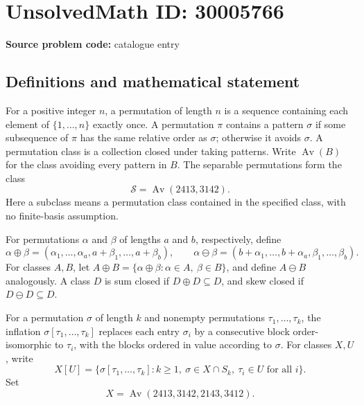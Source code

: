 \documentclass[11pt]{article}
\begin{document}
\section*{UnsolvedMath ID: 30005766}
\textbf{Source problem code:} catalogue entry
\subsection{Definitions and mathematical statement}
For a positive integer \(n\), a permutation of length \(n\) is a sequence containing each element of \(\{1,\ldots,n\}\) exactly once. A permutation \(\pi\) contains a pattern \(\sigma\) if some subsequence of \(\pi\) has the same relative order as \(\sigma\); otherwise it avoids \(\sigma\). A permutation class is a collection closed under taking patterns. Write \(\operatorname{Av}(B)\) for the class avoiding every pattern in \(B\). The separable permutations form the class
\[
\mathcal S=\operatorname{Av}(2413,3142).
\]
Here a subclass means a permutation class contained in the specified class, with no finite-basis assumption.

For permutations \(\alpha\) and \(\beta\) of lengths \(a\) and \(b\), respectively, define
\[
\alpha\oplus\beta=(\alpha_1,\ldots,\alpha_a,a+\beta_1,\ldots,a+\beta_b),
\qquad
\alpha\ominus\beta=(b+\alpha_1,\ldots,b+\alpha_a,\beta_1,\ldots,\beta_b).
\]
For classes \(A,B\), let \(A\oplus B=\{\alpha\oplus\beta:\alpha\in A,\ \beta\in B\}\), and define \(A\ominus B\) analogously. A class \(D\) is sum closed if \(D\oplus D\subseteq D\), and skew closed if \(D\ominus D\subseteq D\).

For a permutation \(\sigma\) of length \(k\) and nonempty permutations \(\tau_1,\ldots,\tau_k\), the inflation \(\sigma[\tau_1,\ldots,\tau_k]\) replaces each entry \(\sigma_i\) by a consecutive block order-isomorphic to \(\tau_i\), with the blocks ordered in value according to \(\sigma\). For classes \(X,U\), write
\[
X[U]=\{\sigma[\tau_1,\ldots,\tau_k]:k\geq1,\ \sigma\in X\cap S_k,\ \tau_i\in U\text{ for all }i\}.
\]
Set
\[
X=\operatorname{Av}(2413,3142,2143,3412).
\]
\end{document}
